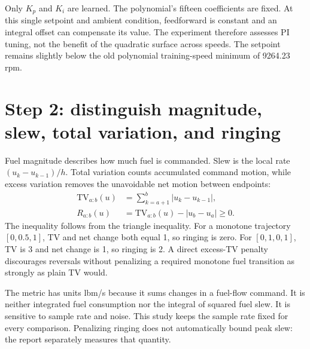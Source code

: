 \documentclass[11pt,a4paper]{article}
\begin{document}
Only $K_p$ and $K_i$ are learned. The polynomial's fifteen coefficients are fixed. At this single setpoint and ambient condition, feedforward is constant and an integral offset can compensate its value. The experiment therefore assesses PI tuning, not the benefit of the quadratic surface across speeds. The setpoint remains slightly below the old polynomial training-speed minimum of 9264.23 rpm.

\section{Step 2: distinguish magnitude, slew, total variation, and ringing}
Fuel magnitude describes how much fuel is commanded. Slew is the local rate $(u_k-u_{k-1})/h$. Total variation counts accumulated command motion, while excess variation removes the unavoidable net motion between endpoints:
\begin{align}
\mathrm{TV}_{a:b}(u)&=\sum_{k=a+1}^{b}|u_k-u_{k-1}|,\\
R_{a:b}(u)&=\mathrm{TV}_{a:b}(u)-|u_b-u_a|\ge0.
\end{align}
The inequality follows from the triangle inequality. For a monotone trajectory $[0,0.5,1]$, TV and net change both equal 1, so ringing is zero. For $[0,1,0,1]$, TV is 3 and net change is 1, so ringing is 2. A direct excess-TV penalty discourages reversals without penalizing a required monotone fuel transition as strongly as plain TV would.

The metric has units lbm/s because it sums changes in a fuel-flow command. It is neither integrated fuel consumption nor the integral of squared fuel slew. It is sensitive to sample rate and noise. This study keeps the sample rate fixed for every comparison. Penalizing ringing does not automatically bound peak slew: the report separately measures that quantity.
\end{document}
